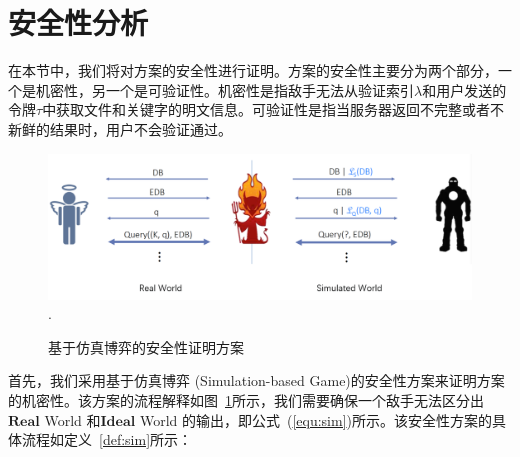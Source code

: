 \section{安全性分析}
\label{sec:single-security}
在本节中，我们将对方案的安全性进行证明。方案的安全性主要分为两个部分，一个是机密性，另一个是可验证性。机密性是指敌手无法从验证索引$\lambda$和用户发送的令牌$\tau$中获取文件和关键字的明文信息。可验证性是指当服务器返回不完整或者不新鲜的结果时，用户不会验证通过。
\begin{figure}[t]
\centering
\includegraphics[width=6 in]{fig/security}
\DeclareGraphicsExtensions.
\caption{基于仿真博弈的安全性证明方案}
\label{fig:security}
\end{figure}

首先，我们采用基于仿真博弈 (Simulation-based Game)的安全性方案来证明方案的机密性。该方案的流程解释如图~\ref{fig:security}所示，我们需要确保一个敌手无法区分出$\mathbf{Real}$ World 和$\mathbf{Ideal}$ World 的输出，即公式~(\ref{equ:sim})所示。该安全性方案的具体流程如定义~\ref{def:sim}所示：

